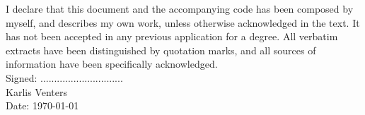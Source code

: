 I declare that this document and the accompanying code has been
composed by myself, and describes my own work, unless otherwise acknowledged in
the text. It has not been accepted in any previous application for a degree.
All verbatim extracts have been distinguished by quotation marks, and all
sources of information have been specifically acknowledged.\\[5ex]

Signed: .............................. \\[3ex]

Karlis Venters \\[3ex]

Date: \today \\[3ex]
